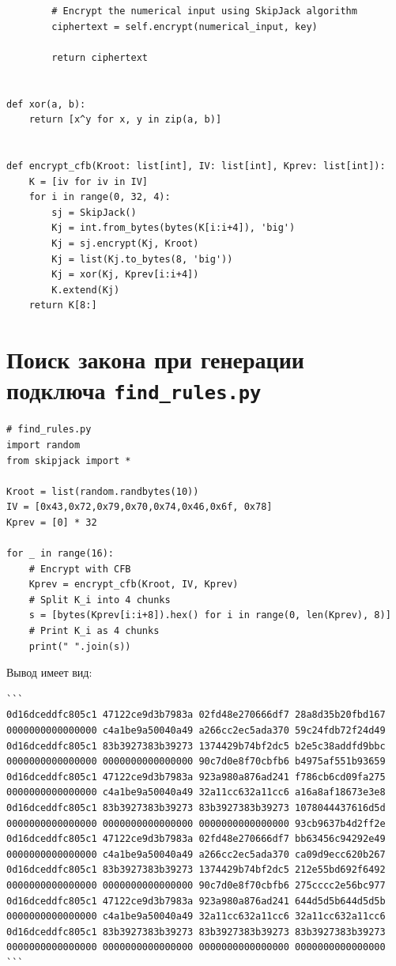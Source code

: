 \documentclass{article}
\begin{document}
\begin{verbatim}
        # Encrypt the numerical input using SkipJack algorithm
        ciphertext = self.encrypt(numerical_input, key)

        return ciphertext


def xor(a, b):
    return [x^y for x, y in zip(a, b)]


def encrypt_cfb(Kroot: list[int], IV: list[int], Kprev: list[int]):
    K = [iv for iv in IV]
    for i in range(0, 32, 4):
        sj = SkipJack()
        Kj = int.from_bytes(bytes(K[i:i+4]), 'big')
        Kj = sj.encrypt(Kj, Kroot)
        Kj = list(Kj.to_bytes(8, 'big'))
        Kj = xor(Kj, Kprev[i:i+4])
        K.extend(Kj)
    return K[8:]
\end{verbatim}

\section{Поиск закона при генерации подключа \texttt{find\_rules.py}}

\begin{verbatim}
# find_rules.py
import random
from skipjack import *

Kroot = list(random.randbytes(10))
IV = [0x43,0x72,0x79,0x70,0x74,0x46,0x6f, 0x78]
Kprev = [0] * 32

for _ in range(16):
    # Encrypt with CFB
    Kprev = encrypt_cfb(Kroot, IV, Kprev)
    # Split K_i into 4 chunks
    s = [bytes(Kprev[i:i+8]).hex() for i in range(0, len(Kprev), 8)]
    # Print K_i as 4 chunks
    print(" ".join(s))
\end{verbatim}

Вывод имеет вид:

\begin{verbatim}
```
0d16dceddfc805c1 47122ce9d3b7983a 02fd48e270666df7 28a8d35b20fbd167
0000000000000000 c4a1be9a50040a49 a266cc2ec5ada370 59c24fdb72f24d49
0d16dceddfc805c1 83b3927383b39273 1374429b74bf2dc5 b2e5c38addfd9bbc
0000000000000000 0000000000000000 90c7d0e8f70cbfb6 b4975af551b93659
0d16dceddfc805c1 47122ce9d3b7983a 923a980a876ad241 f786cb6cd09fa275
0000000000000000 c4a1be9a50040a49 32a11cc632a11cc6 a16a8af18673e3e8
0d16dceddfc805c1 83b3927383b39273 83b3927383b39273 1078044437616d5d
0000000000000000 0000000000000000 0000000000000000 93cb9637b4d2ff2e
0d16dceddfc805c1 47122ce9d3b7983a 02fd48e270666df7 bb63456c94292e49
0000000000000000 c4a1be9a50040a49 a266cc2ec5ada370 ca09d9ecc620b267
0d16dceddfc805c1 83b3927383b39273 1374429b74bf2dc5 212e55bd692f6492
0000000000000000 0000000000000000 90c7d0e8f70cbfb6 275cccc2e56bc977
0d16dceddfc805c1 47122ce9d3b7983a 923a980a876ad241 644d5d5b644d5d5b
0000000000000000 c4a1be9a50040a49 32a11cc632a11cc6 32a11cc632a11cc6
0d16dceddfc805c1 83b3927383b39273 83b3927383b39273 83b3927383b39273
0000000000000000 0000000000000000 0000000000000000 0000000000000000
```
\end{verbatim}
\end{document}
